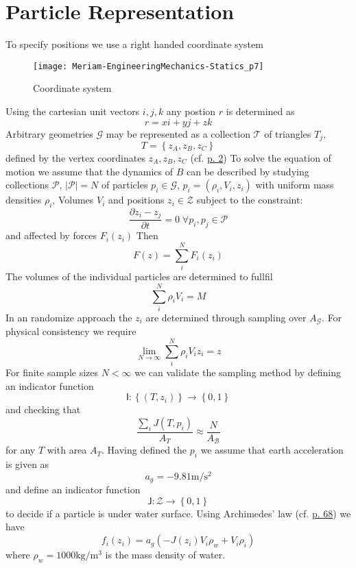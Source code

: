 \section{Particle Representation}
To specify positions we use a right handed coordinate system
\begin{figure}[H]
	\centering
	\texttt{[image: Meriam-EngineeringMechanics-Statics\_p7]}
	\caption{Coordinate system}
	\label{fig:f1/5}
\end{figure}
Using the cartesian unit vectors $i, j, k$ any postion $r$ is determined
as 
$$r = x i + y j + z k$$
Arbitrary geometries $\mathcal{G}$ may be represented as a collection $\mathcal{T}$ of triangles $T_j,$
$$T = \left\{z_A, z_B, z_C\right\}$$
defined by the vertex coordinates $z_A, z_B, z_C$
(cf.  \href{Burkardt-ComputationalGeometryLab-01-Triangles.pdf}{p. 2})
To solve the equation of motion we assume that the dynamics of $B$ can be described by studying collections $\mathcal{P}$, $|\mathcal{P}| = N$ of particles $p_i \in \mathcal{G}$, $p_i = \left(\rho_i, V_i, z_i\right)$ with uniform mass densities $\rho_i$, Volumes $V_i$ and positions $z_i \in \mathcal{Z}$ subject to the constraint:
$$\frac{\partial z_i - z_j}{\partial t} = 0 \; \forall p_i, p_j \in \mathcal{P}$$
and affected by forces $F_i(z_i)$
Then
$$F(z) = \sum\limits_i^N F_i(z_i)$$
The volumes of the individual particles are determined to fullfil
$$\sum\limits_i^N \rho_i V_i = M$$
In an randomize approach the $z_i$ are determined through sampling over $A_\mathcal{G}$.  For physical consistency we require
$$\lim\limits_{N \to \infty} \sum\limits_i^N \rho_i V_i z_i = z$$
For finite sample sizes $N < \infty$ we can validate the sampling method by defining an indicator function 
\begin{equation}
\mathsf{I}: \left\{(T, z_i)\right\} \to \left\{0, 1\right\}
\label{eq:in}
\end{equation}
and checking that
$$\frac{\sum\limits_i J(T, p_i)}{A_T} \approx \frac{N}{A_{\mathcal{B}}}$$
for any $T$ with area $A_T$.  
Having defined the $p_i$ we assume that earth acceleration is given as
$$a_g = - \num{9.81}  \si{\metre\per\square\second}$$ 
and define an indicator function 
$$\mathsf{J}: \mathcal{Z} \to \left\{ 0, 1\right\}$$
to decide if a particle is under water surface.  
Using Archimedes' law
(cf.  \href{LautrupPhysicsOfContinuousMatter}{p. 68})
we have 
$$f_i(z_i) = a_g(- J(z_i) V_i \rho_w + V_i \rho_i)$$
where $\rho_w = \num{1000} \si{\kilo\gram\per\cubic\metre}$ is the mass density of water.

